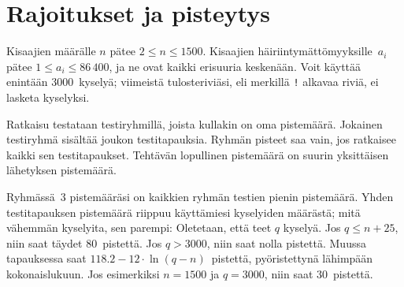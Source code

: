 \section*{Rajoitukset ja pisteytys}

Kisaajien määrälle $n$ pätee 
$2\leq n\leq 1500$. %
Kisaajien häiriintymättömyyksille~$a_i$ pätee
$1\leq a_i\leq 86\,400$, %
ja ne ovat kaikki erisuuria keskenään. %
Voit käyttää enintään $3000$~kyselyä; %
viimeistä tulosteriviäsi, eli merkillä \texttt{!} alkavaa riviä,
ei lasketa kyselyksi.

Ratkaisu testataan testiryhmillä, joista kullakin on oma pistemäärä.
Jokainen testiryhmä sisältää joukon testitapauksia.
Ryhmän pisteet saa vain, jos ratkaisee kaikki sen testitapaukset.
Tehtävän lopullinen pistemäärä on suurin yksittäisen lähetyksen pistemäärä.

Ryhmässä~$3$ pistemääräsi on kaikkien ryhmän testien pienin pistemäärä.
Yhden testitapauksen pistemäärä riippuu käyttämiesi kyselyiden määrästä; 
mitä vähemmän kyselyita, sen parempi:
Oletetaan, että teet $q$ kyselyä.
Jos $q \le n+25$, niin saat täydet $80$~pistettä. 
Jos $q > 3000$, niin saat nolla pistettä.
Muussa tapauksessa saat $118.2 - 12 \cdot \ln(q - n)$~pistettä, 
pyöristettynä lähimpään kokonaislukuun. %
Jos esimerkiksi $n = 1500$ ja $q = 3000$, niin saat $30$~pistettä.


